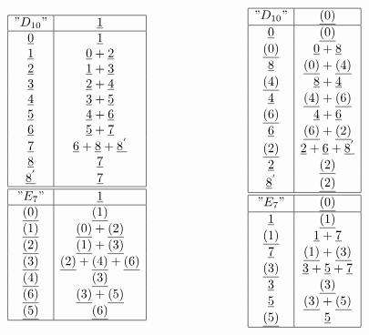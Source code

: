 \documentclass[a4paper,11pt]{article}
\newcommand{\ud}[1]{\underline{#1}}
\begin{document}
\begin{table}[hhh]
$$
\begin{array}{|c|c|}
\hline
"D_{10}" & \ud1 \\
\hline
\ud0 & \ud1 \\
\ud1 & \ud0 + \ud2 \\
\ud2 & \ud1 + \ud3 \\
\ud3 & \ud2 + \ud4 \\
\ud4 & \ud3 + \ud5 \\
\ud5 & \ud4 + \ud6 \\
\ud6 & \ud5 + \ud7 \\
\ud7 & \ud6 + \ud8 + \ud{8^{'}}\\
\ud8 & \ud7 \\
\ud{8^{'}} & \ud7 \\
\hline
\hline
"E_7" & \ud1 \\
\hline
\ud{(0)} & \ud{(1)} \\
\ud{(1)} & \ud{(0)} + \ud{(2)} \\
\ud{(2)} & \ud{(1)} + \ud{(3)} \\
\ud{(3)} & \ud{(2)} + \ud{(4)} + \ud{(6)} \\
\ud{(4)} & \ud{(3)} \\
\ud{(6)} & \ud{(3)} + \ud{(5)} \\
\ud{(5)} & \ud{(6)} \\
\hline
\end{array}
\qquad \qquad \qquad \qquad
\begin{array}{|c|c|}
\hline
"D_{10}" & \ud{(0)} \\
\hline
\ud0 & \ud{(0)} \\
\ud{(0)} & \ud0 + \ud8 \\
\ud8 & \ud{(0)} + \ud{(4)} \\
\ud{(4)} & \ud8 + \ud4 \\
\ud4 & \ud{(4)} + \ud{(6)} \\
\ud{(6)} & \ud4 + \ud6 \\
\ud6 & \ud{(6)} + \ud{(2)} \\
\ud{(2)} & \ud2 + \ud6 + \ud{8^{'}}\\
\ud2 & \ud{(2)} \\
\ud8^{'} & \ud{(2)} \\
\hline
\hline
"E_7" & \ud{(0)} \\
\hline
\ud1 & \ud{(1)} \\
\ud{(1)} & \ud1 + \ud7 \\
\ud7 & \ud{(1)} + \ud{(3)} \\
\ud{(3)} & \ud3+\ud5+\ud7 \\
\ud3 & \ud{(3)} \\
\ud5 & \ud{(3)} + \ud{(5)} \\
\ud{(5)} & \ud5 \\
\hline
\end{array}
$$
\caption{Multiplication of the elements of the Ocneanu algebra of
$E_7$ by the generators}
\end{table}
\end{document}
